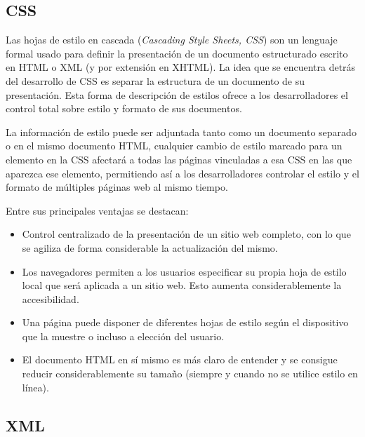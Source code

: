   
  
  \subsection{CSS} %
    \label{sub:tec_css}
    
    Las hojas de estilo en cascada ({\it Cascading Style Sheets, CSS}) son un lenguaje formal usado para definir la presentación de un documento estructurado escrito en HTML o XML (y por extensión en XHTML). La idea que se encuentra detrás del desarrollo de CSS es separar la estructura de un documento de su presentación. Esta forma de descripción de estilos ofrece a los desarrolladores el control total sobre estilo y formato de sus documentos.
    
    La información de estilo puede ser adjuntada tanto como un documento separado o en el mismo documento HTML, cualquier cambio de estilo marcado para un elemento en la CSS afectará a todas las páginas vinculadas a esa CSS en las que aparezca ese elemento, permitiendo así a los desarrolladores controlar el estilo y el formato de múltiples páginas web al mismo tiempo.
    
    Entre sus principales ventajas se destacan:
    
      \begin{itemize}
        \item Control centralizado de la presentación de un sitio web completo, con lo que se agiliza de forma considerable la actualización del mismo.
        \item Los navegadores permiten a los usuarios especificar su propia hoja de estilo local que será aplicada a un sitio web. Esto aumenta considerablemente la accesibilidad.
        \item Una página puede disponer de diferentes hojas de estilo según el dispositivo que la muestre o incluso a elección del usuario.
        \item El documento HTML en sí mismo es más claro de entender y se consigue reducir considerablemente su tamaño (siempre y cuando no se utilice estilo en línea).
      \end{itemize}
  
  \subsection{XML} %
    \label{sub:tec_xml}
    
